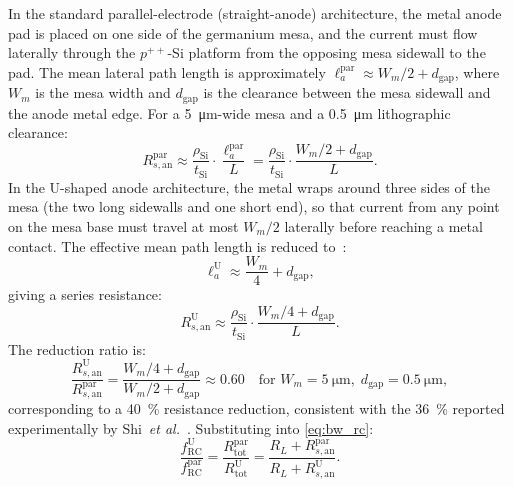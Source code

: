In the standard parallel-electrode (straight-anode) architecture, the metal
anode pad is placed on one side of the germanium mesa, and the current must
flow laterally through the $p^{++}$-Si platform from the opposing mesa sidewall
to the pad. The mean lateral path length is approximately
$\ell_a^{\mathrm{par}}\approx W_m/2+d_{\mathrm{gap}}$, where $W_m$ is the mesa
width and $d_{\mathrm{gap}}$ is the clearance between the mesa sidewall and the
anode metal edge. For a \SI{5}{\micro\metre}-wide mesa and a \SI{0.5}{\micro\metre}
lithographic clearance:
\begin{equation}
    R_{s,\mathrm{an}}^{\mathrm{par}}
    \approx \frac{\rho_{\mathrm{Si}}}{t_{\mathrm{Si}}}
    \cdot\frac{\ell_a^{\mathrm{par}}}{L}
    = \frac{\rho_{\mathrm{Si}}}{t_{\mathrm{Si}}}
    \cdot\frac{W_m/2+d_{\mathrm{gap}}}{L}.
    \label{eq:rs_parallel}
\end{equation}
In the U-shaped anode architecture, the metal wraps around three sides of the
mesa (the two long sidewalls and one short end), so that current from any point
on the mesa base must travel at most $W_m/2$ laterally before reaching a
metal contact. The effective mean path length is reduced to~\cite{Shi2024}:
\begin{equation}
    \ell_a^{\mathrm{U}} \approx \frac{W_m}{4} + d_{\mathrm{gap}},
    \label{eq:la_u}
\end{equation}
giving a series resistance:
\begin{equation}
    R_{s,\mathrm{an}}^{\mathrm{U}}
    \approx \frac{\rho_{\mathrm{Si}}}{t_{\mathrm{Si}}}
    \cdot\frac{W_m/4+d_{\mathrm{gap}}}{L}.
    \label{eq:rs_u}
\end{equation}
The reduction ratio is:
\begin{equation}
    \frac{R_{s,\mathrm{an}}^{\mathrm{U}}}{R_{s,\mathrm{an}}^{\mathrm{par}}}
    = \frac{W_m/4+d_{\mathrm{gap}}}{W_m/2+d_{\mathrm{gap}}}
    \approx 0.60 \quad\text{for } W_m=\SI{5}{\micro\metre},\;d_{\mathrm{gap}}=\SI{0.5}{\micro\metre},
    \label{eq:rs_ratio}
\end{equation}
corresponding to a \SI{40}{\percent} resistance reduction, consistent with the
\SI{36}{\percent} reported experimentally by Shi~\textit{et al.}~\cite{Shi2024}.
Substituting into \cref{eq:bw_rc}:
\begin{equation}
    \frac{f_{\mathrm{RC}}^{\mathrm{U}}}{f_{\mathrm{RC}}^{\mathrm{par}}}
    = \frac{R_{\mathrm{tot}}^{\mathrm{par}}}{R_{\mathrm{tot}}^{\mathrm{U}}}
    = \frac{R_L + R_{s,\mathrm{an}}^{\mathrm{par}}}{R_L + R_{s,\mathrm{an}}^{\mathrm{U}}}.
    \label{eq:frc_ratio}
\end{equation}
